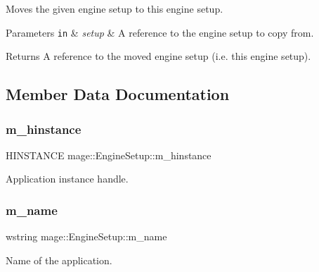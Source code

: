 Moves the given engine setup to this engine setup.


\begin{DoxyParams}[1]{Parameters}
\mbox{\tt in}  & {\em setup} & A reference to the engine setup to copy from. \\
\hline
\end{DoxyParams}
\begin{DoxyReturn}{Returns}
A reference to the moved engine setup (i.\+e. this engine setup). 
\end{DoxyReturn}


\subsection{Member Data Documentation}
\hypertarget{classmage_1_1_engine_setup_af91461305cd9aa60e22fa770395d2238}{}\label{classmage_1_1_engine_setup_af91461305cd9aa60e22fa770395d2238} 
\subsubsection{\texorpdfstring{m\+\_\+hinstance}{m\_hinstance}}
{\footnotesize\ttfamily H\+I\+N\+S\+T\+A\+N\+CE mage\+::\+Engine\+Setup\+::m\+\_\+hinstance\hspace{0.3cm}{\ttfamily [private]}}

Application instance handle. \hypertarget{classmage_1_1_engine_setup_a3866920e44c0752a89265f9f0c5c5d05}{}\label{classmage_1_1_engine_setup_a3866920e44c0752a89265f9f0c5c5d05} 
\subsubsection{\texorpdfstring{m\+\_\+name}{m\_name}}
{\footnotesize\ttfamily wstring mage\+::\+Engine\+Setup\+::m\+\_\+name\hspace{0.3cm}{\ttfamily [private]}}

Name of the application. 